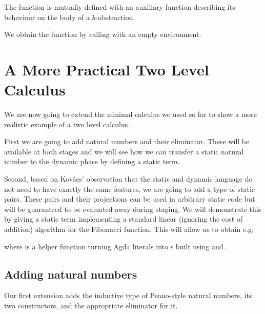 \documentclass{article}
\begin{document}
The function  is mutually defined with an auxiliary
function describing its behaviour on the body of a λ-abstraction.

\begin{AgdaSuppressSpace}
\end{AgdaSuppressSpace}

We obtain the  function by calling  with an
empty environment.

\begin{AgdaSuppressSpace}
\end{AgdaSuppressSpace}


\section{A More Practical Two Level Calculus}

We are now going to extend the minimal calculus we used so far to
show a more realistic example of a two level calculus.

First we are going to add natural numbers and their eliminator.
These will be available at both stages and we will see how we
can transfer a static natural number to the dynamic phase by
defining a static  term.

Second, based on Kov{\'{a}}cs' observation that the static and
dynamic language do not need to have exactly the same features,
we are going to add a type of static pairs.
%
These pairs and their projections can be used in arbitrary static
code but will be guaranteed to be evaluated away during staging.
%
We will demonstrate this by giving a static term 
implementing a standard linear (ignoring the cost of addition)
algorithm for the Fibonacci function.
%
This will allow us to obtain e.g.


\noindent where  is a helper function turning Agda
literals into s built using  and .

\subsection{Adding natural numbers}

Our first extension adds the inductive type of Peano-style natural numbers,
its two constructors, and the appropriate eliminator for it.
\end{document}
